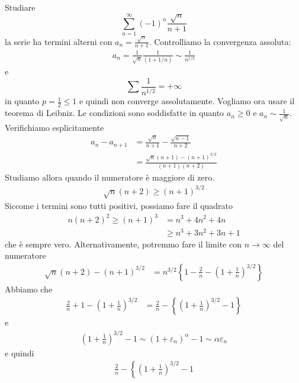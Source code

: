 \documentclass[a4paper]{article}
\begin{document}
\begin{snippetexample}{}
    Studiare
    \[
        \sum_{n=1}^\infty {(-1)}^n \frac{\sqrt{n}}{n+1}
    \]
    la serie ha termini alterni con \(a_n = \frac{\sqrt{n}}{n+1}\).
    Controlliamo la convergenza assoluta:
    \begin{align*}
        a_n = \frac{1}{\sqrt{n}} \frac{1}{(1+1/n)} \sim \frac{1}{n^{1/2}}
    \end{align*}
    e
    \[
        \sum \frac{1}{n^{1/2}} = +\infty
    \]
    in quanto \(p = \frac{1}{2} \leq 1\) e quindi non converge assolutamente.
    Vogliamo ora usare il teorema di Leibniz.
    Le condizioni sono soddisfatte in quanto \(a_n \geq 0\) e \(a_n \sim \frac{1}{\sqrt{n}}\).
    Verifichiamo esplicitamente
    \begin{align*}
        a_n - a_{n+1} &= \frac{\sqrt{n}}{n+1} - \frac{\sqrt{n-1}}{n+2} \\
        &= \frac{\sqrt{n}(n+1)-{(n+1)}^{3/2}}{(n+1)(n+2)}
    \end{align*}
    Studiamo allora quando il numeratore è maggiore di zero.
    \begin{align*}
        \sqrt{n}(n+2) \geq {(n+1)}^{3/2}
    \end{align*}
    Siccome i termini sono tutti positivi, possiamo fare il quadrato
    \begin{align*}
        n{(n+2)}^2 \geq {(n+1)}^3 &= n^3 + 4n^2 + 4n \\
        & \geq n^3 + 3n^2 + 3n + 1
    \end{align*}
    che è sempre vero.
    Alternativamente, potremmo fare il limite con \(n \to \infty\) del numeratore
    \begin{align*}
        \sqrt{n}(n+2) - {(n+1)}^{3/2} &= n^{3/2} \left\{
            1 - \frac{2}{n} - {\left(1 + \frac{1}{n}\right)}^{3/2}
        \right\}
    \end{align*}
    Abbiamo che
    \begin{align*}
        \frac{2}{n} + 1- \left(1 + \frac{1}{n}\right)^{3/2} &= \frac{2}{n} - \left\{
            {\left(1+\frac{1}{n}\right)}^{3/2} - 1
        \right\}
    \end{align*}
    e
    \begin{align*}
        {\left(1+\frac{1}{n}\right)}^{3/2} - 1 \sim {(1+\varepsilon_n)}^{\alpha} - 1
        \sim \alpha \varepsilon_n
    \end{align*}
    e quindi
    \begin{align*}
        \frac{2}{n} - \left\{
            {\left(1+\frac{1}{n}\right)}^{3/2} - 1

\end{align*}
\end{snippetexample}
\end{document}
